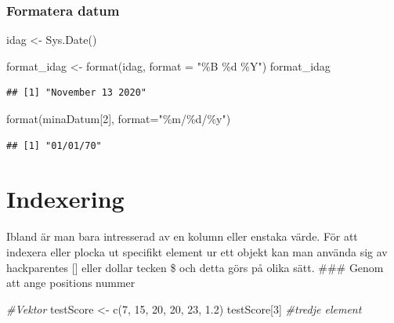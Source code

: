 \documentclass[
]{book}
\newenvironment{Shaded}{\begin{snugshade}}{\end{snugshade}}
\newcommand{\AttributeTok}[1]{\textcolor[rgb]{0.77,0.63,0.00}{#1}}
\newcommand{\CommentTok}[1]{\textcolor[rgb]{0.56,0.35,0.01}{\textit{#1}}}
\newcommand{\DecValTok}[1]{\textcolor[rgb]{0.00,0.00,0.81}{#1}}
\newcommand{\FloatTok}[1]{\textcolor[rgb]{0.00,0.00,0.81}{#1}}
\newcommand{\FunctionTok}[1]{\textcolor[rgb]{0.00,0.00,0.00}{#1}}
\newcommand{\NormalTok}[1]{#1}
\newcommand{\OtherTok}[1]{\textcolor[rgb]{0.56,0.35,0.01}{#1}}
\newcommand{\StringTok}[1]{\textcolor[rgb]{0.31,0.60,0.02}{#1}}
\begin{document}
\hypertarget{formatera-datum}{%
\subsubsection{Formatera datum}\label{formatera-datum}}

\begin{Shaded}
\begin{Highlighting}[]
\NormalTok{idag }\OtherTok{\textless{}{-}} \FunctionTok{Sys.Date}\NormalTok{()}

\NormalTok{format\_idag }\OtherTok{\textless{}{-}} \FunctionTok{format}\NormalTok{(idag, }\AttributeTok{format =} \StringTok{"\%B \%d \%Y"}\NormalTok{)}
\NormalTok{format\_idag}
\end{Highlighting}
\end{Shaded}

\begin{verbatim}
## [1] "November 13 2020"
\end{verbatim}

\begin{Shaded}
\begin{Highlighting}[]
\FunctionTok{format}\NormalTok{(minaDatum[}\DecValTok{2}\NormalTok{], }\AttributeTok{format=}\StringTok{"\%m/\%d/\%y"}\NormalTok{)}
\end{Highlighting}
\end{Shaded}

\begin{verbatim}
## [1] "01/01/70"
\end{verbatim}

\hypertarget{indexering}{%
\section{Indexering}\label{indexering}}

Ibland är man bara intresserad av en kolumn eller enstaka värde. För att indexera eller plocka ut specifikt element ur ett objekt kan man använda sig av hackparentes {[}{]} eller dollar tecken \$ och detta görs på olika sätt.
\#\#\# Genom att ange positions nummer

\begin{Shaded}
\begin{Highlighting}[]
\CommentTok{\#Vektor}
\NormalTok{testScore }\OtherTok{\textless{}{-}} \FunctionTok{c}\NormalTok{(}\DecValTok{7}\NormalTok{, }\DecValTok{15}\NormalTok{, }\DecValTok{20}\NormalTok{, }\DecValTok{20}\NormalTok{, }\DecValTok{23}\NormalTok{, }\FloatTok{1.2}\NormalTok{)}
\NormalTok{testScore[}\DecValTok{3}\NormalTok{] }\CommentTok{\#tredje element}
\end{Highlighting}
\end{Shaded}
\end{document}
